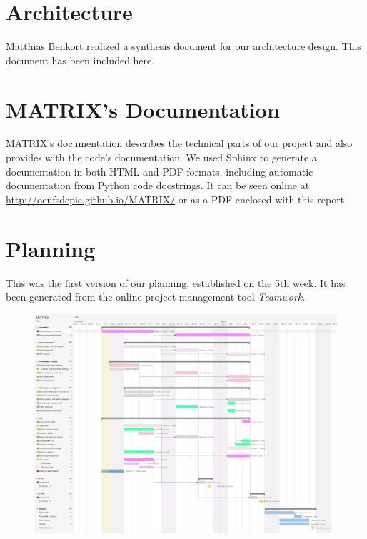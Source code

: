 \documentclass[a4paper]{report}
\begin{document}


\chapter{Architecture}
Matthias Benkort realized a synthesis document for our architecture
design. This document has been included here.



\chapter{MATRIX's Documentation}
MATRIX's documentation describes the technical parts of our project
and also provides with the code's documentation. We used Sphinx to
generate a documentation in both HTML and PDF formats, including
automatic documentation from Python code docstrings. It can be seen
online at \url{http://oeufsdepie.github.io/MATRIX/} or as a PDF enclosed
with this report.


\chapter{Planning}

\thispagestyle{empty} 

This was the first version of our planning, established on the 5th
week. It has been generated from the online project management tool
\emph{Teamwork}.
\begin{figure}[!htbp]
  \centering
  \includegraphics[width=\linewidth]{img/planning.pdf}
  \label{app:planning}
\end{figure}
\restoregeometry
\end{document}
